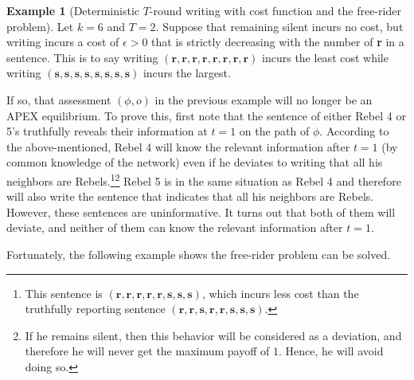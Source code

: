 \documentclass[12pt,letter]{article}
\newcommand\omicron{o}
\theoremstyle{definition}
\newtheorem{example}{Example}
\theoremstyle{remark}
\theoremstyle{claim}
\begin{document}
\begin{example}[Deterministic $T$-round writing with cost function and the free-rider problem]
\label{ex:cost_function_talk_fr}
Let $k=6$ and $T=2$. Suppose that remaining silent incurs no cost, but writing incurs a cost of  $\epsilon>0$ that is strictly decreasing with the number of \textbf{r} in a sentence. This is to say writing $(\textbf{r},\textbf{r},\textbf{r},\textbf{r},\textbf{r},\textbf{r},\textbf{r},\textbf{r})$ incurs the least cost while writing $(\textbf{s},\textbf{s},\textbf{s},\textbf{s},\textbf{s},\textbf{s},\textbf{s},\textbf{s})$ incurs the largest. 

If so, that assessment $(\phi, \omicron)$ in the previous example will no longer be an APEX equilibrium. To prove this, first note that the sentence of either Rebel 4 or 5's truthfully reveals their information at $t=1$ on the path of $\phi$. According to the above-mentioned, Rebel 4 will know the relevant information after $t=1$ (by common knowledge of the network) even if he deviates to writing that all his neighbors are Rebels.\footnote{This sentence is $(\textbf{r},\textbf{r},\textbf{r},\textbf{r},\textbf{r},\textbf{s},\textbf{s},\textbf{s})$, which incurs less cost than the truthfully reporting sentence $(\textbf{r},\textbf{r},\textbf{s},\textbf{r},\textbf{r},\textbf{s},\textbf{s},\textbf{s})$.}\footnote{If he remains silent, then this behavior will be considered as a deviation, and therefore he will never get the maximum payoff of $1$. Hence, he will avoid doing so.}
Rebel 5 is in the same situation as Rebel 4 and therefore will also write the sentence that indicates that all his neighbors are Rebels. However, these sentences are uninformative. It turns out that both of them will deviate, and neither of them can know the relevant information after $t=1$.

Fortunately, the following example shows the free-rider problem can be solved. 
\end{example}
\end{document}
